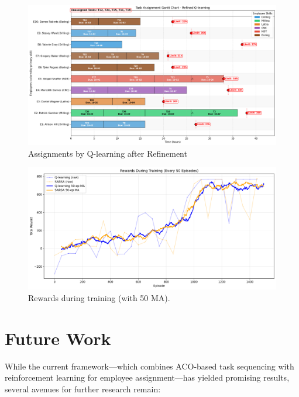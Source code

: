 \documentclass[%
aip,
cp,  %
reprint
]{revtex4-2}
\begin{document}
	\begin{figure}[H]
		\centering
		\includegraphics[width=1\textwidth]{figures/gantt_q_after.png}
		\caption{\label{fig:q_learning}Assignments by Q-learning after Refinement}
	\end{figure}
	
	\begin{figure}[H]
		\centering
		\includegraphics[width=1\textwidth]{figures/rewards_history.png}
		\caption{\label{fig:rewards_training}Rewards during training (with 50 MA).}
	\end{figure}
	
	\section{\label{sec:future}Future Work}
	
	While the current framework—which combines ACO-based task sequencing with
	reinforcement learning for employee assignment—has yielded promising results, several
	avenues for further research remain:
	
\end{document}
